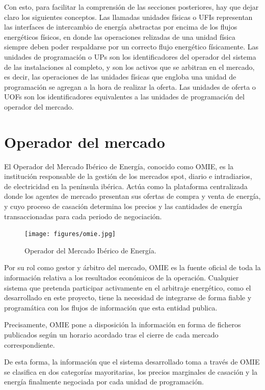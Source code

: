 Con esto, para facilitar la comprensión de las secciones posteriores, hay que dejar claro los siguientes conceptos. Las llamadas unidades físicas o UFIs representan las interfaces de intercambio de energía abstractas por encima de los flujos energéticos físicos, en donde las operaciones relizadas de una unidad física siempre deben poder respaldarse por un correcto flujo energético físicamente. Las unidades de programación o UPs son los identificadores del operador del sistema de las instalaciones al completo, y son los activos que se arbitran en el mercado, es decir, las operaciones de las unidades físicas que engloba una unidad de programación se agregan a la hora de realizar la oferta. Las unidades de oferta o UOFs son los identificadores equivalentes a las unidades de programación del operador del mercado.

\section{Operador del mercado}
\label{makereference4.1}

El Operador del Mercado Ibérico de Energía, conocido como OMIE, es la institución responsable de la gestión de los mercados spot, diario e intradiarios, de electricidad en la península ibérica. Actúa como la plataforma centralizada donde los agentes de mercado presentan sus ofertas de compra y venta de energía, y cuyo proceso de casación determina los precios y las cantidades de energía transaccionadas para cada periodo de negociación.

\begin{figure}
  \centering
  \texttt{[image: figures/omie.jpg]}
  \caption{Operador del Mercado Ibérico de Energía.}
  \label{fig:omie}
\end{figure}

Por su rol como gestor y árbitro del mercado, OMIE es la fuente oficial de toda la información relativa a los resultados económicos de la operación. Cualquier sistema que pretenda participar activamente en el arbitraje energético, como el desarrollado en este proyecto, tiene la necesidad de integrarse de forma fiable y programática con los flujos de información que esta entidad publica.

Precisamente, OMIE pone a disposición la información en forma de ficheros publicados según un horario acordado tras el cierre de cada mercado correspondiente.

De esta forma, la información que el sistema desarrollado toma a través de OMIE se clasifica en dos categorías mayoritarias, los precios marginales de casación y la energía finalmente negociada por cada unidad de programación.

